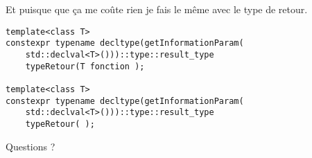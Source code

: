 \documentclass{beamer}
\begin{document}
\begin{frame}[containsverbatim]
Et puisque que ça me coûte rien je fais le même avec le type de retour.  
\begin{lstlisting}
template<class T>
constexpr typename decltype(getInformationParam(
    std::declval<T>()))::type::result_type 
    typeRetour(T fonction );

template<class T>
constexpr typename decltype(getInformationParam(
    std::declval<T>()))::type::result_type 
    typeRetour( );
\end{lstlisting}

\end{frame} 



\begin{frame}
    \begin{center}
        \Huge Questions ? 
    \end{center}
\end{frame}
\end{document}
